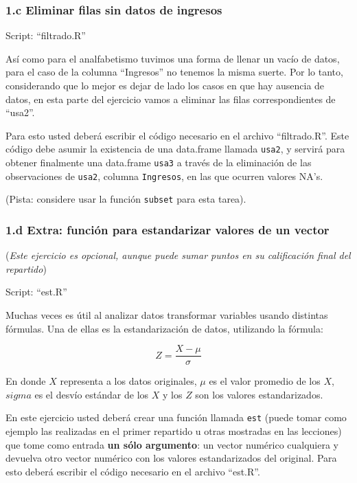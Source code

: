 \documentclass[]{article}
\newenvironment{Shaded}{}{}
\newcommand{\NormalTok}[1]{{#1}}
\begin{document}
\begin{Shaded}
\end{Shaded}
\subsubsection{1.c Eliminar filas sin datos de ingresos}

Script: ``filtrado.R''

Así como para el analfabetismo tuvimos una forma de llenar un vacío de
datos, para el caso de la columna ``Ingresos'' no tenemos la misma
suerte. Por lo tanto, considerando que lo mejor es dejar de lado los
casos en que hay ausencia de datos, en esta parte del ejercicio vamos a
eliminar las filas correspondientes de ``usa2''.

Para esto usted deberá escribir el código necesario en el archivo
``filtrado.R''. Este código debe asumir la existencia de una data.frame
llamada \texttt{usa2}, y servirá para obtener finalmente una data.frame
\texttt{usa3} a través de la eliminación de las observaciones de
\texttt{usa2}, columna \texttt{Ingresos}, en las que ocurren valores
NA's.

(Pista: considere usar la función \texttt{subset} para esta tarea).

\subsubsection{1.d Extra: función para estandarizar valores de un
vector}

(\emph{Este ejercicio es opcional, aunque puede sumar puntos en su
calificación final del repartido})

Script: ``est.R''

Muchas veces es útil al analizar datos transformar variables usando
distintas fórmulas. Una de ellas es la estandarización de datos,
utilizando la fórmula:

\[Z = \frac{X - \mu}{\sigma}\]

En donde $X$ representa a los datos originales, $\mu$ es el valor
promedio de los $X$, $sigma$ es el desvío estándar de los $X$ y los $Z$
son los valores estandarizados.

En este ejercicio usted deberá crear una función llamada \texttt{est}
(puede tomar como ejemplo las realizadas en el primer repartido u otras
mostradas en las lecciones) que tome como entrada \textbf{un sólo
argumento}: un vector numérico cualquiera y devuelva otro vector
numérico con los valores estandarizados del original. Para esto deberá
escribir el código necesario en el archivo ``est.R''.
\end{document}
